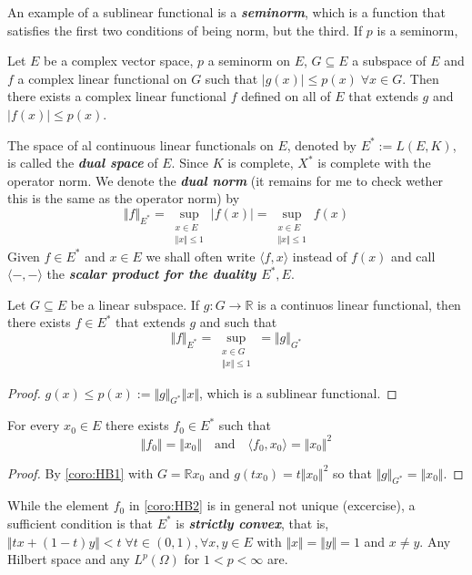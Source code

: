 \documentclass{article}
\theoremstyle{definition}
\numberwithin{equation}{section}
\newcommand{\R}{\mathbb{R}}
\begin{document}
	An example of a sublinear functional is a \textbf{\textit{seminorm}}, which is a function that satisfies the first two conditions of being norm, but the third. If $p$ is a seminorm, 
	\begin{thm}
		Let $E$ be a complex vector space, $p$ a seminorm on $E$, $G\subseteq E$ a subspace of $E$ and $f$ a complex linear functional on $G$ such that $|g(x)|\leq p(x)\;\forall x\in G$. Then there exists a complex linear functional $f$ defined on all of $E$ that extends $g$ and $|f(x)|\leq p(x)$.
	\end{thm}
	
	The space of al continuous linear functionals on $E$, denoted by $E^*:=L(E,K)$, is called the \textbf{\textit{dual space}} of $E$. Since $K$ is complete, $X^*$ is complete with the operator norm. We denote the \textbf{\textit{dual norm}} (it remains for me to check wether this is the same as the operator norm) by
	\[\Vert f\Vert_{E^*}=\sup_{\substack{x\in E\\\Vert x\Vert\leq1}}|f(x)|=\sup_{\substack{x\in E\\\Vert x\Vert\leq1}}f(x)\]
	Given $f\in E^*$ and $x\in E$ we shall often write $\langle f,x\rangle$ instead of $f(x)$ and call $\langle-,-\rangle$ the \textbf{\textit{scalar product for the duality $E^*,E$}}.
	\begin{coro}\label{coro:HB1}
		Let $G\subseteq E$ be a linear subspace. If $g:G\to\R$ is a continuos linear functional, then there exists $f\in E^*$ that extends $g$ and such that
		\[\Vert f\Vert_{E^*}=\sup_{\substack{x\in G\\\Vert x\Vert\leq1}}=\Vert g\Vert_{G^*}\]
	\end{coro}
	\begin{proof}
		$g(x)\leq p(x):=\Vert g\Vert_{G^*}\Vert x\Vert$, which is a sublinear functional.
	\end{proof}
	\begin{coro}\label{coro:HB2}
		For every $x_0\in E$ there exists $f_0\in E^*$ such that
		\[\Vert f_0\Vert=\Vert x_0\Vert\quad\text{and}\quad\langle f_0,x_0\rangle=\Vert x_0\Vert^2\]
	\end{coro}
	\begin{proof}
		By \cref{coro:HB1} with $G=\R x_0$ and $g(tx_0)=t\Vert x_0\Vert^2$ so that $\Vert g\Vert_{G^*}=\Vert x_0\Vert$.
	\end{proof}
	While the element $f_0$ in \cref{coro:HB2} is in general not unique (excercise), a sufficient condition is that $E^*$ is \textbf{\textit{strictly convex}}, that is, $\Vert tx+(1-t)y\Vert<t\;\forall t\in(0,1),\forall x,y\in E$ with $\Vert x\Vert =\Vert y\Vert=1$ and $x\neq y$. Any Hilbert space and any $L^p(\Omega)$ for $1<p<\infty$ are.
	
\end{document}
